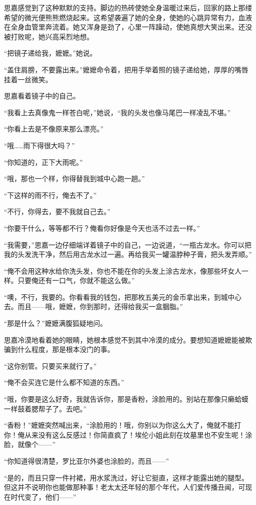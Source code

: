 \par 思嘉感觉到了这种默默的支持。脚边的热砖使她全身温暖过来后，回家的路上那缕希望的微光便熊熊燃烧起来。这希望袭遍了她的全身，使她的心跳异常有力，血液在全身血管里奔流着。她又浑身是劲了，心里一阵躁动，使她真想大笑出来。还没被打败呢，她兴高采烈地想。
\par “把镜子递给我，嬷嬷。”她说。
\par “盖住肩膀，不要露出来。”嬷嬷命令着，把用手举着照的镜子递给她，厚厚的嘴唇挂着一丝微笑。
\par 思嘉看着镜子中的自己。
\par “我看上去真像鬼一样苍白呢，”她说，“我的头发也像马尾巴一样凌乱不堪。”
\par “你看上去是不像原来那么漂亮。”
\par “哦……雨下得很大吗？”
\par “你知道的，正下大雨呢。”
\par “哦，那也一个样，你得替我到城中心跑一趟。”
\par “下这样的雨不行，俺去不了。”
\par “不行，你得去，要不我就自己去。”
\par “你要干什么，等等都不行？俺看你好像是今天也活不过去一样。”
\par “我需要，”思嘉一边仔细端详着镜子中的自己，一边说道，“一瓶古龙水。你可以把我的头发洗干净，然后用古龙水过一遍。再给我买一罐温脖种子膏，把头发弄顺。”
\par “俺不会用这种水给你洗头发，你也不能在你的头发上涂古龙水，像那些坏女人一样。只要俺还有一口气，你就不能这么做。”
\par “噢，不行，我要的。你看看我的钱包，把那枚五美元的金币拿出来，到城中心去。而且——哦，嬷嬷，你到那时，还得给我买一盒胭脂。”
\par “那是什么？”嬷嬷满腹狐疑地问。
\par 思嘉冷漠地看着她的眼睛，她根本感觉不到其中冷漠的成分。要想知道嬷嬷能被欺骗到什么程度，那是根本没门的事。
\par “这你别管。只要买来就行了。”
\par “俺不会买连它是什么都不知道的东西。”
\par “哦，你要是这么好奇，我就告诉你，那是香粉，涂脸用的。别站在那像只癞蛤蟆一样鼓着腮帮子了。去吧。”
\par “香粉！”嬷嬷突然喊出来，“涂脸用的！哦，你别以为你这么大了，俺就不能打你！俺从来没有这么反感过！你简直疯了！埃伦小姐此刻在坟墓里也不安生呢！涂脸，就像个——”
\par “你知道得很清楚，罗比亚尔外婆也涂脸的，而且——”
\par “是的，而且只穿一件衬裙，用水浆洗过，好让它挺直，这样才能露出她的腿型。但这并不说明你也能做那种事！老太太还年轻的那个年代，人们爱传播丑闻，可现在时代变了，他们——”
